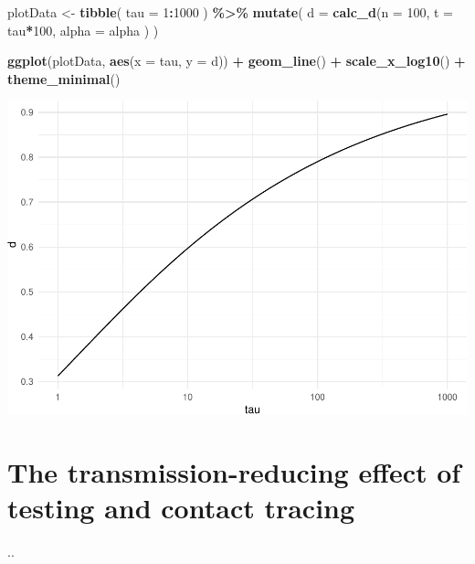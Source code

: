 \documentclass[
]{article}
\newenvironment{Shaded}{\begin{snugshade}}{\end{snugshade}}
\newcommand{\DataTypeTok}[1]{\textcolor[rgb]{0.13,0.29,0.53}{#1}}
\newcommand{\DecValTok}[1]{\textcolor[rgb]{0.00,0.00,0.81}{#1}}
\newcommand{\KeywordTok}[1]{\textcolor[rgb]{0.13,0.29,0.53}{\textbf{#1}}}
\newcommand{\NormalTok}[1]{#1}
\newcommand{\OperatorTok}[1]{\textcolor[rgb]{0.81,0.36,0.00}{\textbf{#1}}}
\newcommand{\StringTok}[1]{\textcolor[rgb]{0.31,0.60,0.02}{#1}}
\begin{document}
\begin{Shaded}
\begin{Highlighting}[]
\NormalTok{plotData \textless{}{-}}\StringTok{ }\KeywordTok{tibble}\NormalTok{(}
  \DataTypeTok{tau =} \DecValTok{1}\OperatorTok{:}\DecValTok{1000}
\NormalTok{) }\OperatorTok{\%\textgreater{}\%}
\KeywordTok{mutate}\NormalTok{(}
  \DataTypeTok{d =} \KeywordTok{calc\_d}\NormalTok{(}\DataTypeTok{n =} \DecValTok{100}\NormalTok{, }\DataTypeTok{t =}\NormalTok{ tau}\OperatorTok{*}\DecValTok{100}\NormalTok{, }\DataTypeTok{alpha =}\NormalTok{ alpha )    }
\NormalTok{)}

\KeywordTok{ggplot}\NormalTok{(plotData, }\KeywordTok{aes}\NormalTok{(}\DataTypeTok{x =}\NormalTok{ tau, }\DataTypeTok{y =}\NormalTok{ d)) }\OperatorTok{+}
\StringTok{  }\KeywordTok{geom\_line}\NormalTok{() }\OperatorTok{+}
\StringTok{  }\KeywordTok{scale\_x\_log10}\NormalTok{() }\OperatorTok{+}
\StringTok{  }\KeywordTok{theme\_minimal}\NormalTok{()}
\end{Highlighting}
\end{Shaded}

\includegraphics{pareto_model_of_testing_files/figure-latex/unnamed-chunk-4-1.pdf}

\hypertarget{the-transmission-reducing-effect-of-testing-and-contact-tracing}{%
\section{The transmission-reducing effect of testing and contact
tracing}\label{the-transmission-reducing-effect-of-testing-and-contact-tracing}}

..
\end{document}
